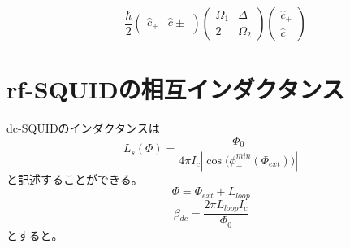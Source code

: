 \begin{equation}
    -\frac{\hbar}{2}\left(\begin{array}{cc}
    \hat{c}_{+} & \hat{c} \pm
    \end{array}\right)\left(\begin{array}{cc}
    \Omega_{1} & \Delta \\
    2 & \Omega_{2}
    \end{array}\right)\left(\begin{array}{l}
    \hat{c}_{+} \\
    \hat{c}_{-}
    \end{array}\right)
\end{equation}

\section{rf-SQUIDの相互インダクタンス}
dc-SQUIDのインダクタンスは
\begin{equation}
    L_{s}(\Phi)=\frac{\Phi_0}{4\pi I_{c}|{\cos({\phi_{-}^{min}(\Phi_{ext})}})|}
\end{equation}
と記述することができる。
\begin{equation}
    \Phi=\Phi_{ext}+L_{loop}
\end{equation}
\begin{equation}
    \beta_{dc}=\frac{2\pi L_{loop} I_{c}}{\Phi_{0}}
\end{equation}
とすると。
